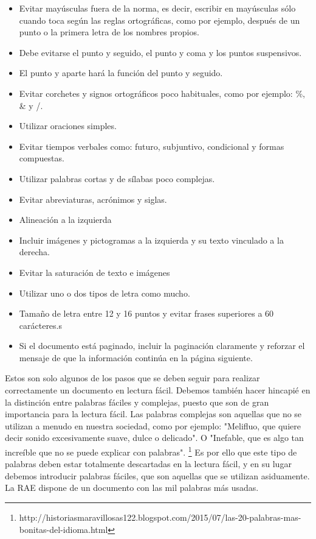 \begin{itemize}
	\item Evitar mayúsculas fuera de la norma, es decir, escribir en mayúsculas sólo cuando toca según las reglas ortográficas, como por ejemplo, después de un punto o la primera letra de los nombres propios.
	\item Debe evitarse el punto y seguido, el punto y coma y los puntos suspensivos.
	\item El punto y aparte hará la función del punto y seguido.
	\item Evitar corchetes y signos ortográficos poco habituales, como por ejemplo: \%, \& y /.
	\item Utilizar oraciones simples.
	\item Evitar tiempos verbales como: futuro, subjuntivo, condicional y formas compuestas.
	\item Utilizar palabras cortas y de sílabas poco complejas.
	\item Evitar abreviaturas, acrónimos y siglas.
	\item Alineación a la izquierda
	\item Incluir imágenes y pictogramas a la izquierda y su texto vinculado a la derecha.
	\item Evitar la saturación de texto e imágenes
	\item Utilizar uno o dos tipos de letra como mucho.
	\item Tamaño de letra entre 12 y 16 puntos y evitar frases superiores a 60 carácteres.s
	\item Si el documento está paginado, incluir la paginación claramente y reforzar el mensaje de que la información continúa en la página siguiente.
\end{itemize}

Estos son solo algunos de los pasos que se deben seguir para realizar correctamente un documento en lectura fácil. 
Debemos también hacer hincapié en la distinción entre palabras fáciles y complejas, puesto que son de gran importancia para la lectura fácil. 
Las palabras complejas son aquellas que no se utilizan a menudo en nuestra sociedad, como por ejemplo: "Melifluo, que quiere decir sonido excesivamente suave, dulce o delicado". O "Inefable, que es algo tan increíble que no se puede explicar con palabras".
\footnote{http://historiasmaravillosas122.blogspot.com/2015/07/las-20-palabras-mas-bonitas-del-idioma.html}
Es por ello que este tipo de palabras deben estar totalmente descartadas en la lectura fácil, y en su lugar debemos introducir palabras fáciles, que son aquellas que se utilizan asiduamente. La RAE dispone de un documento con las mil palabras más usadas.


